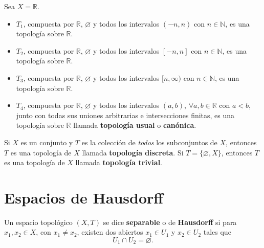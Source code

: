 \begin{ejemplo}
Sea $X = \mathbb{R}$.
\begin{itemize}
\item $T_1$, compuesta por $\mathbb{R}$, $\varnothing$ y todos los
intervalos $(-n,n)$ con $n\in\mathbb{N}$, es una topología sobre
$\mathbb{R}$.
\item $T_2$, compuesta por $\mathbb{R}$, $\varnothing$ y todos los
intervalos $[-n,n]$ con $n\in\mathbb{N}$, es una topología sobre
$\mathbb{R}$.
\item $T_3$, compuesta por $\mathbb{R}$, $\varnothing$ y todos los
intervalos $[n,\infty)$ con $n\in\mathbb{N}$, es una topología sobre
$\mathbb{R}$.
\item $T_4$, compuesta por $\mathbb{R}$, $\varnothing$ y todos los
intervalos $(a,b)$, $\forall a,b\in\mathbb{R}$ con $a<b$, junto con todas sus
uniones arbitrarias e intersecciones finitas, es una topología sobre
$\mathbb{R}$ llamada \textbf{topología usual} o \textbf{canónica}.
\end{itemize}
\end{ejemplo}

\begin{definicion}
Si $X$ es un conjunto y $T$ es la colección de \emph{todos} los
subconjuntos de $X$, entonces $T$ es una topología de $X$ llamada
\textbf{topología discreta}. Si $T = \{\varnothing, X\}$, entonces $T$ es
una topología de $X$ llamada \textbf{topología trivial}.
\end{definicion}

\section{Espacios de Hausdorff}

\begin{definicion}
Un espacio topológico $(X,T)$ se dice \textbf{separable} o de
\textbf{Hausdorff} si para $x_1,x_2\in X$, con $x_1\neq x_2$, existen dos
abiertos $x_1\in U_1$ y $x_2\in U_2$ tales que
\[
U_1 \cap U_2 = \varnothing .
\]
\end{definicion}

